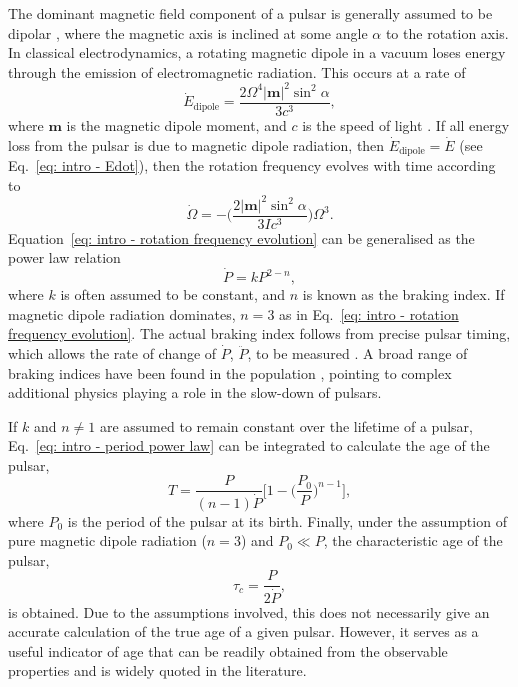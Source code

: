 The dominant magnetic field component of a pulsar is generally assumed to be dipolar \citep[][]{Pxxx1968}, where the magnetic axis is inclined at some angle $\alpha$ to the rotation axis. In classical electrodynamics, a rotating magnetic dipole in a vacuum loses energy through the emission of electromagnetic radiation. This occurs at a rate of 
\begin{equation}
    \label{eq: intro - dipole Edot}
    \dot{E}_\mathrm{dipole} = \frac{2\Omega^4|\mathbf{m}|^2\sin^2\alpha}{3c^3},
\end{equation}
where $\mathbf{m}$ is the magnetic dipole moment, and $c$ is the speed of light \citep[see for example][]{Jxxx1962}. If all energy loss from the pulsar is due to magnetic dipole radiation, then $\dot{E}_\mathrm{dipole} = \dot{E}$ (see Eq.~\eqref{eq: intro - Edot}), then the rotation frequency evolves with time according to
\begin{equation}
    \label{eq: intro - rotation frequency evolution}
    \dot{\Omega} = -\bigg( \frac{2|\mathbf{m}|^2\sin^2\alpha}{3Ic^3}\bigg)\Omega^3.
\end{equation} 
Equation~\eqref{eq: intro - rotation frequency evolution} can be generalised as the power law relation
\begin{equation}
    \label{eq: intro - period power law}
    \dot{P} = kP^{2-n},
\end{equation}
where $k$ is often assumed to be constant, and $n$ is known as the braking index. If magnetic dipole radiation dominates, $n=3$ as in Eq.~\eqref{eq: intro - rotation frequency evolution}. The actual braking index follows from precise pulsar timing, which allows the rate of change of $\dot{P}$, $\ddot{P}$, to be measured \citep[e.g.][]{Lxxx2020}. A broad range of braking indices have been found in the population \citep[e.g.][]{HLK+2004,HLKx2010}, pointing to complex additional physics playing a role in the slow-down of pulsars.

If $k$ and $n\neq 1$ are assumed to remain constant over the lifetime of a pulsar, Eq.~\eqref{eq: intro - period power law} can be integrated to calculate the age of the pulsar,
\begin{equation}
    \label{eq: intro - pulsar age}
    T = \frac{P}{(n-1)\dot{P}}\bigg[ 1 - \bigg(\frac{P_0}{P}\bigg)^{n-1} \bigg],
\end{equation}
where $P_0$ is the period of the pulsar at its birth. Finally, under the assumption of pure magnetic dipole radiation ($n=3$) and $P_0 \ll P$, the characteristic age of the pulsar,
\begin{equation}
    \label{eq: intro - characteristic age}
    \tau_c = \frac{P}{2\dot{P}},
\end{equation}
is obtained. Due to the assumptions involved, this does not necessarily give an accurate calculation of the true age of a given pulsar. However, it serves as a useful indicator of age that can be readily obtained from the observable properties and is widely quoted in the literature.



